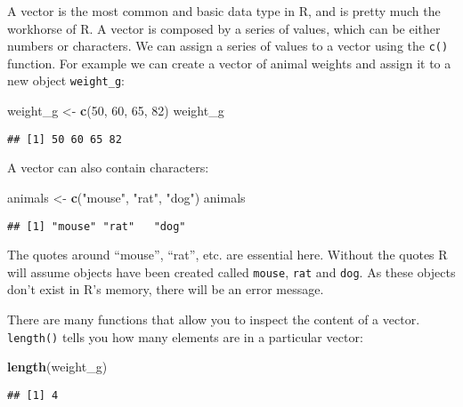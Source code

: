 \documentclass[]{book}
\newenvironment{Shaded}{\begin{snugshade}}{\end{snugshade}}
\newcommand{\DecValTok}[1]{\textcolor[rgb]{0.00,0.00,0.81}{#1}}
\newcommand{\KeywordTok}[1]{\textcolor[rgb]{0.13,0.29,0.53}{\textbf{#1}}}
\newcommand{\NormalTok}[1]{#1}
\newcommand{\StringTok}[1]{\textcolor[rgb]{0.31,0.60,0.02}{#1}}
\begin{document}
A vector is the most common and basic data type in R, and is pretty much the workhorse of R. A vector is composed by a series of values, which can be either numbers or characters. We can assign a series of values to a vector using the \texttt{c()} function. For example we can create a vector of animal weights and assign it to a new object \texttt{weight\_g}:

\begin{Shaded}
\begin{Highlighting}[]
\NormalTok{weight_g <-}\StringTok{ }\KeywordTok{c}\NormalTok{(}\DecValTok{50}\NormalTok{, }\DecValTok{60}\NormalTok{, }\DecValTok{65}\NormalTok{, }\DecValTok{82}\NormalTok{)}
\NormalTok{weight_g}
\end{Highlighting}
\end{Shaded}

\begin{verbatim}
## [1] 50 60 65 82
\end{verbatim}

A vector can also contain characters:

\begin{Shaded}
\begin{Highlighting}[]
\NormalTok{animals <-}\StringTok{ }\KeywordTok{c}\NormalTok{(}\StringTok{"mouse"}\NormalTok{, }\StringTok{"rat"}\NormalTok{, }\StringTok{"dog"}\NormalTok{)}
\NormalTok{animals}
\end{Highlighting}
\end{Shaded}

\begin{verbatim}
## [1] "mouse" "rat"   "dog"
\end{verbatim}

The quotes around ``mouse'', ``rat'', etc. are essential here. Without the quotes R will assume objects have been created called \texttt{mouse}, \texttt{rat} and \texttt{dog}. As these objects don't exist in R's memory, there will be an error message.

There are many functions that allow you to inspect the content of a vector. \texttt{length()} tells you how many elements are in a particular vector:

\begin{Shaded}
\begin{Highlighting}[]
\KeywordTok{length}\NormalTok{(weight_g)}
\end{Highlighting}
\end{Shaded}

\begin{verbatim}
## [1] 4
\end{verbatim}
\end{document}
